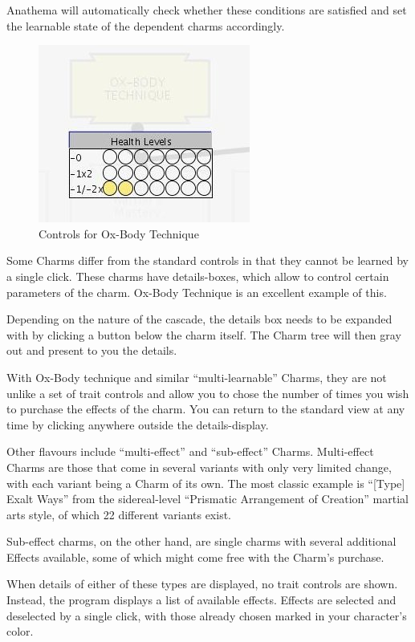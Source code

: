Anathema will automatically check whether these conditions are satisfied and set the learnable state of the dependent charms accordingly. 

\begin{figure}
	\centering
		\includegraphics{images/OxBodyTechnique.jpg}
	\caption{Controls for Ox-Body Technique}
	\label{fig:OxBodyTechnique}
\end{figure}

Some Charms differ from the standard controls in that they cannot be learned by a single click. These charms have details-boxes, which allow to control certain parameters of the charm. Ox-Body Technique is an excellent example of this. 

Depending on the nature of the cascade, the details box needs to be expanded with by clicking a button below the charm itself. The Charm tree will then gray out and present to you the details.

With Ox-Body technique and similar "`multi-learnable"' Charms, they are not unlike a set of trait controls and allow you to chose the number of times you wish to purchase the effects of the charm. You can return to the standard view at any time by clicking anywhere outside the details-display.

Other flavours include "`multi-effect"' and "`sub-effect"' Charms. Multi-effect Charms are those that come in several variants with only very limited change, with each variant being a Charm of its own. The most classic example is "`[Type] Exalt Ways"' from the sidereal-level "`Prismatic Arrangement of Creation"' martial arts style, of which 22 different variants exist.

Sub-effect charms, on the other hand, are single charms with several additional Effects available, some of which might come free with the Charm's purchase.

When details of either of these types are displayed, no trait controls are shown. Instead, the program displays a list of available effects. Effects are selected and deselected by a single click, with those already chosen marked in your character's color.

